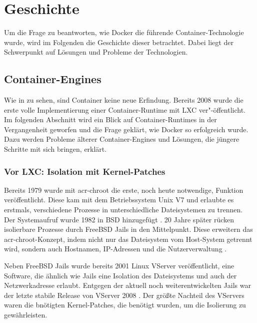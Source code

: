 \chapter{Geschichte}
\label{chap:geschichte}
Um die Frage zu beantworten, wie Docker die führende Container-Technologie wurde, wird im Folgenden die Geschichte dieser betrachtet. Dabei liegt der Schwerpunkt auf Lösungen und Probleme der Technologien.
 
\section{Container-Engines}
\label{sec:lxc2containerd}
Wie in  zu sehen, sind Container keine neue Erfindung. Bereits 2008 wurde die erste volle Implementierung einer Container-Runtime mit LXC ver"-öffentlicht. Im folgenden Abschnitt wird ein Blick auf Container-Runtimes in der Vergangenheit geworfen und die Frage geklärt, wie Docker so erfolgreich wurde. Dazu werden Probleme älterer Container-Engines und Lösungen, die jüngere Schritte mit sich bringen, erklärt.

\subsection{Vor LXC: Isolation mit Kernel-Patches}
\label{sec:geschichteVorLXC}

Bereits 1979 wurde mit \gls{acr-chroot} die erste, noch heute notwendige, Funktion veröffentlicht. Diese kam mit dem Betriebssystem Unix V7 und erlaubte es erstmals, verschiedene Prozesse in unterschiedliche Dateisystemen zu trennen. Der Systemaufruf wurde 1982 in BSD hinzugefügt \citep{ABriefHistoryofContainers:fromthe1970sto2017}. 20 Jahre später rücken isolierbare Prozesse durch FreeBSD Jails in den Mittelpunkt. Diese erweitern das \Gls{acr-chroot}-Konzept, indem nicht nur das Dateisystem vom Host-System getrennt wird, sondern auch Hostnamen, IP-Adressen und die Nutzerverwaltung \citep{FreeBSDHandbook}. 

Neben FreeBSD Jails wurde bereits 2001 Linux VServer veröffentlicht, eine Software, die ähnlich wie Jails eine Isolation des Dateisystems und auch der Netzwerkadresse erlaubt. Entgegen der aktuell noch weiterentwickelten Jails war der letzte stabile Release von VServer 2008 \citep{PaperLinuxVServer}. Der größte Nachteil des VServers waren die bnötigten Kernel-Patches, die benötigt wurden, um die Isolierung zu gewährleisten.


